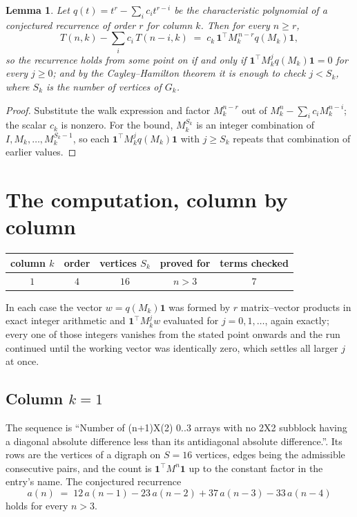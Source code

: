 \documentclass[11pt,a4paper]{article}
\theoremstyle{plain}
\newtheorem{lemma}[theorem]{Lemma}
\theoremstyle{definition}
\begin{document}
\begin{lemma}\label{lem:crit}
Let $q(t)=t^{r}-\sum_i c_it^{r-i}$ be the characteristic polynomial of a conjectured
recurrence of order $r$ for column $k$. Then for every $n\ge r$,
\[
T(n,k)-\sum_i c_i\,T(n-i,k)\;=\;c_k\,\mathbf{1}^{\!\top}M_k^{\,n-r}q(M_k)\mathbf{1},
\]
so the recurrence holds from some point on if and only if
$\mathbf{1}^{\!\top}M_k^{j}q(M_k)\mathbf{1}=0$ for every $j\ge0$; and by the
Cayley--Hamilton theorem it is enough to check $j<S_k$, where $S_k$ is the number of vertices
of $G_k$.
\end{lemma}

\begin{proof}
Substitute the walk expression and factor $M_k^{n-r}$ out of $M_k^{n}-\sum_ic_iM_k^{n-i}$;
the scalar $c_k$ is nonzero. For the bound, $M_k^{S_k}$ is an integer combination of
$I,M_k,\dots,M_k^{S_k-1}$, so each $\mathbf{1}^{\!\top}M_k^{j}q(M_k)\mathbf{1}$ with
$j\ge S_k$ repeats that combination of earlier values.
\end{proof}

\section{The computation, column by column}

\begin{center}
\begin{tabular}{ccccc}
column $k$ & order & vertices $S_k$ & proved for & terms checked \\ \hline
$1$ & $4$ & $16$ & $n>3$ & $7$ \\
\end{tabular}
\end{center}

In each case the vector $w=q(M_k)\mathbf{1}$ was formed by $r$ matrix--vector products in
exact integer arithmetic and $\mathbf{1}^{\!\top}M_k^{j}w$ evaluated for $j=0,1,\dots$,
again exactly; every one of those integers vanishes from the stated point onwards and the run
continued until the working vector was identically zero, which settles all larger $j$ at once.

\subsection*{Column $k=1$}
The sequence is ``Number of (n+1)X(2) 0..3 arrays with no 2X2 subblock having a diagonal absolute difference less than its antidiagonal absolute difference.''. Its rows are the vertices of a digraph on
$S=16$ vertices, edges being the admissible consecutive pairs, and the count is
$\mathbf{1}^{\!\top}M^{n}\mathbf{1}$ up to the constant factor in the entry's name.
The conjectured recurrence
\[
a(n)\;=\;12\,a(n-1) - 23\,a(n-2) + 37\,a(n-3) - 33\,a(n-4)
\]
holds for every $n>3$.
\end{document}
